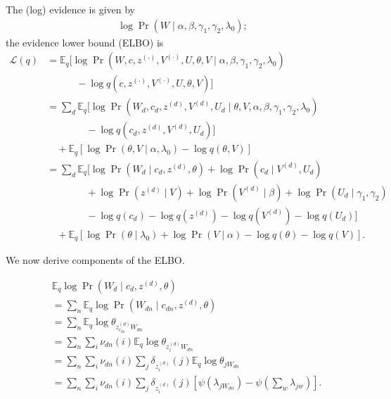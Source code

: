 \documentclass{article}
\newcommand{\digamma}[1]{\ensuremath{\psi\left(#1\right)}}
\newcommand{\Elogdirichlet}[2]{\ensuremath{\digamma{#1} - \digamma{#2}}}
\newcommand{\Eq}{\ensuremath{\mathbb{E}_q\xspace}}
\newcommand{\Lq}{\ensuremath{\mathcal{L}(q)}}
\begin{document}
The (log) evidence is given by
\begin{align*}
    \log \Pr\left(W \mid \alpha, \beta, \gamma_1, \gamma_2, \lambda_0\right);
\end{align*}
the evidence lower bound (ELBO) is
\begin{align*}
    \Lq &= \Eq \Bigg[
            \log \Pr\left(W, c, z^{(\cdot)}, V^{(\cdot)}, U, \theta, V \mid \alpha, \beta, \gamma_1, \gamma_2, \lambda_0\right) \\
            &\qquad\quad - \log q\left(c, z^{(\cdot)}, V^{(\cdot)}, U, \theta, V\right)
        \Bigg] \\
    &= \sum_d \Eq \Bigg[
            \log \Pr\left(W_d, c_d, z^{(d)}, V^{(d)}, U_d \mid \theta, V, \alpha, \beta, \gamma_1, \gamma_2, \lambda_0\right) \\
            &\qquad\qquad - \log q\left(c_d, z^{(d)}, V^{(d)}, U_d\right)
        \Bigg] \\
        &\quad + \Eq \left[
            \log \Pr\left(\theta, V \mid \alpha, \lambda_0\right)
            - \log q\left(\theta, V\right)
        \right] \\
    &= \sum_d \Eq \Bigg[
            \log \Pr\left(W_d \mid c_d, z^{(d)}, \theta\right)
            + \log \Pr\left(c_d \mid V^{(d)}, U_d\right) \\
            &\qquad\qquad + \log \Pr\left(z^{(d)} \mid V\right)
            + \log \Pr\left(V^{(d)} \mid \beta\right)
            + \log \Pr\left(U_d \mid \gamma_1, \gamma_2\right) \\
            &\qquad\qquad - \log q\left(c_d\right)
            - \log q\left(z^{(d)}\right)
            - \log q\left(V^{(d)}\right)
            - \log q\left(U_d\right)
        \Bigg] \\
        &\quad + \Eq \left[
            \log \Pr\left(\theta \mid \lambda_0\right)
            + \log \Pr\left(V \mid \alpha\right)
            - \log q\left(\theta\right)
            - \log q\left(V\right)
        \right] .
\end{align*}

We now derive components of the ELBO.

\begin{align*}
    &\Eq \log \Pr\left(W_d \mid c_d, z^{(d)}, \theta\right) \\
    &= \sum_n \Eq \log \Pr\left(W_{dn} \mid c_{dn}, z^{(d)}, \theta\right) \\
    &= \sum_n \Eq \log \theta_{z_{c_{dn}}^{(d)} W_{dn}} \\
    &= \sum_n \sum_i \nu_{dn}(i) \Eq \log \theta_{z_i^{(d)} W_{dn}} \\
    &= \sum_n \sum_i \nu_{dn}(i) \sum_j \delta_{z_i^{(d)}}(j) \Eq \log \theta_{j W_{dn}} \\
    &= \sum_n \sum_i \nu_{dn}(i) \sum_j \delta_{z_i^{(d)}}(j) \left[ \Elogdirichlet{\lambda_{j W_{dn}}}{\sum_{w}{\lambda_{jw}}} \right] .
\end{align*}
\end{document}
